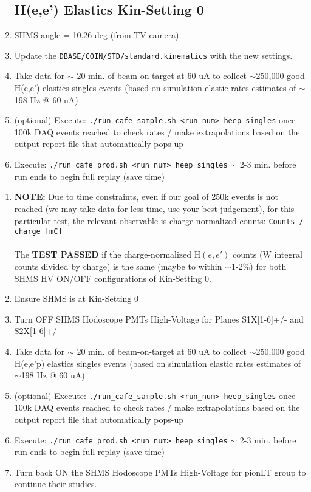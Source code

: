 \documentclass{article}
\begin{document}
    \begin{enumerate}
    \subsection*{H(e,e') Elastics Kin-Setting 0}
    \item SHMS angle = 10.26 deg (from TV camera)
    \item Update the \texttt{DBASE/COIN/STD/standard.kinematics} with the new settings.
    \item Take data for $\sim$ 20  min. of beam-on-target at 60 uA to collect $\sim$250,000 good H(e,e') elastics singles events (based on simulation elastic rates estimates of $\sim$198 Hz @ 60 uA)
    \item (optional) Execute: \texttt{./run\_cafe\_sample.sh <run\_num> heep\_singles} once 100k DAQ events reached to check rates / make extrapolations based on the output report file that automatically pops-up
    \item Execute: \texttt{./run\_cafe\_prod.sh <run\_num> heep\_singles} $\sim$ 2-3 min. before run ends to begin full replay (save time)
    \end{enumerate}

  \begin{enumerate}
    \subsection*{H(e,e')p Elastics Kin-Setting 0 (SHMS HODO HV TEST )}
    \item[]   \textbf{NOTE:} Due to time constraints, even if our goal of 250k events is not reached (we may take data for less time, use your best judgement), for this particular test, the relevant observable is charge-normalized counts: \texttt{Counts / charge [mC]}\\ \\
    The \textbf{TEST PASSED} if the charge-normalized H$(e,e')$ counts (W integral counts divided by charge) is the same (maybe to within $\sim$1-2\%) for both SHMS HV ON/OFF configurations of Kin-Setting 0. \\ 
    \item Ensure SHMS is at Kin-Setting 0
    \item Turn OFF SHMS Hodoscope PMTs High-Voltage for Planes S1X[1-6]+/- and S2X[1-6]+/- 
    \item Take data for $\sim$ 20  min. of beam-on-target at 60 uA to collect $\sim$250,000 good H(e,e'p) elastics singles events (based on simulation elastic rates estimates of $\sim$198 Hz @ 60 uA)
    \item (optional) Execute: \texttt{./run\_cafe\_sample.sh <run\_num> heep\_singles} once 100k DAQ events reached to check rates / make extrapolations based on the output report file that automatically pops-up
    \item Execute: \texttt{./run\_cafe\_prod.sh <run\_num> heep\_singles} $\sim$ 2-3 min. before run ends to begin full replay (save time)
    \item  Turn back ON the SHMS Hodoscope PMTs High-Voltage for pionLT group to continue their studies.
    
    \end{enumerate}
\end{document}
